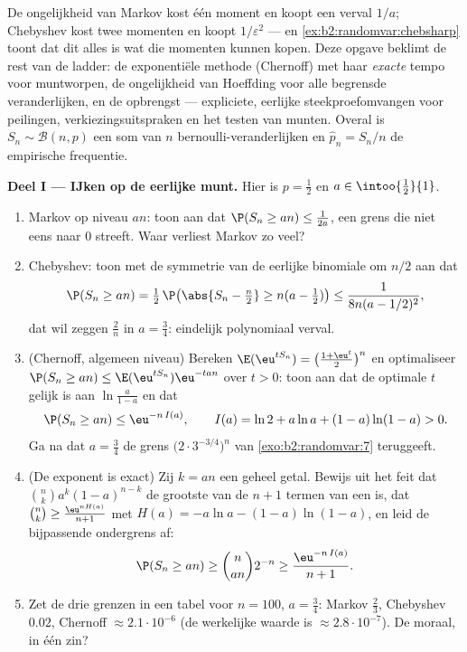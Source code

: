 \begin{problem}
\label{pb:b2:randomvar:1}
De ongelijkheid van Markov kost één moment en koopt een verval
$1/a$; Chebyshev kost twee momenten en koopt $1/\varepsilon^2$ ---
en \cref{ex:b2:randomvar:chebsharp} toont dat dit alles is wat die
momenten kunnen kopen. Deze opgave beklimt de rest van de ladder:
de exponentiële methode (Chernoff) met haar \emph{exacte} tempo
voor muntworpen, de ongelijkheid van Hoeffding voor alle begrensde
veranderlijken, en de opbrengst --- expliciete, eerlijke
steekproefomvangen voor peilingen, verkiezingsuitspraken en het
testen van munten. Overal is $S_n \sim
\mathcal B(n, p)$ een som van $n$ 
bernoulli-veranderlijken en $\widehat p_n = S_n/n$ de empirische
frequentie.

\medskip
\noindent\textbf{Deel I --- IJken op de eerlijke munt.} Hier is $p
= \frac12$ en $a \in \intoo{\frac12}{1}$.
\begin{enumerate}
  \item Markov op niveau $an$: toon aan dat $\P(S_n \geq an) \leq
        \frac1{2a}$, een grens die niet eens naar $0$ streeft. Waar
        verliest Markov zo veel?
  \item Chebyshev: toon met de symmetrie van de eerlijke binomiale
         om $n/2$ aan dat
        \[
        \P(S_n \geq an) = \tfrac12\,
        \P\bigl(\abs{S_n - \tfrac n2} \geq n(a -
        \tfrac12)\bigr)
        \leq \frac{1}{8n(a - 1/2)^2},
        \]
        dat wil zeggen $\frac2n$ in $a = \frac34$: eindelijk
        polynomiaal verval.
  \item (Chernoff, algemeen niveau) Bereken $\E(\eu^{tS_n}) =
        \bigl(\frac{1 + \eu^t}2\bigr)^n$ en optimaliseer $\P(S_n
        \geq an) \leq \E(\eu^{tS_n})\eu^{-tan}$ over $t > 0$: toon
        aan dat de optimale $t$ gelijk is aan
        $\ln\frac{a}{1-a}$ en dat
        \[
        \P(S_n \geq an) \leq \eu^{-n\,I(a)},
        \qquad
        I(a) = \ln 2 + a\ln a + (1-a)\ln(1-a) > 0 .
        \]
        Ga na dat $a = \frac34$ de grens $\bigl(2\cdot3^{-3/4}\bigr)^n$
        van \cref{exo:b2:randomvar:7} teruggeeft.
  \item (De exponent is exact) Zij $k = an$ een geheel getal.
        Bewijs uit het feit dat $\binom nk a^k(1-a)^{n-k}$ de
        grootste van de $n + 1$ termen van een  is,
        dat $\binom nk \geq \frac{\eu^{nH(a)}}{n+1}$ met $H(a) =
        -a\ln a - (1-a)\ln(1-a)$, en leid de bijpassende ondergrens
        af:
        \[
        \P(S_n \geq an) \geq \binom{n}{an}2^{-n}
        \geq \frac{\eu^{-n\,I(a)}}{n + 1} .
        \]
  \item Zet de drie grenzen in een tabel voor $n = 100$, $a =
        \frac34$: Markov $\frac23$, Chebyshev $0.02$, Chernoff
        $\approx 2.1\cdot10^{-6}$ (de werkelijke waarde is $\approx
        2.8\cdot10^{-7}$). De moraal, in één zin?
\end{enumerate}


\end{problem}
